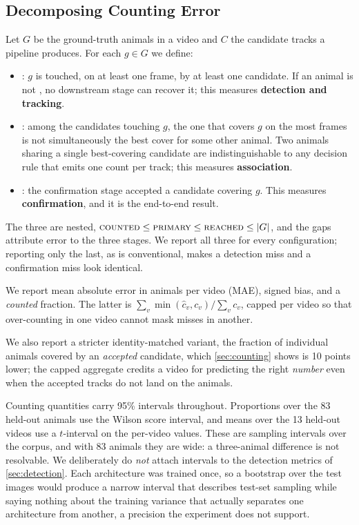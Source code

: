 \subsection{Decomposing Counting Error}
\label{sec:decomposition}

 Let $G$ be the ground-truth animals in a video and $C$
the candidate tracks a pipeline produces. For each $g\in G$ we define:

\begin{itemize}[leftmargin=*,labelsep=4.5mm]
\item \reachedq: $g$ is touched, on at least one frame, by at least one candidate. If
an animal is not \reachedq, no downstream stage can recover it; this measures
\textbf{detection and tracking}.
\item \primaryq: among the candidates touching $g$, the one that covers $g$ on the most
frames is not simultaneously the best cover for some other animal. Two animals sharing a
single best-covering candidate are indistinguishable to any decision rule that emits one
count per track; this measures \textbf{association}.
\item \countedq: the confirmation stage accepted a candidate covering $g$. This measures
\textbf{confirmation}, and it is the end-to-end result.
\end{itemize}

The three are nested, $\textsc{counted} \le \textsc{primary} \le \textsc{reached} \le |G|$, and the gaps
attribute error to the three stages. We report all three for every configuration; reporting
only the last, as is conventional, makes a detection miss and a confirmation miss look identical.

We report mean absolute error in animals per video (MAE), signed bias, and a \emph{counted}
fraction. The latter is $\sum_v \min(\hat{c}_v, c_v) / \sum_v c_v$, capped per video so that
over-counting in one video cannot mask misses in another.

We also report a stricter identity-matched variant, the fraction of individual animals
covered by an \emph{accepted} candidate, which \cref{sec:counting} shows is 10 points
lower; the capped aggregate credits a video for predicting the right \emph{number} even
when the accepted tracks do not land on the animals.

Counting quantities carry 95\% intervals throughout. Proportions over the 83 held-out animals
use the Wilson score interval, and means over the 13 held-out videos use a $t$-interval on the
per-video values. These are sampling intervals over the corpus, and with 83 animals they are
wide: a three-animal difference is not resolvable. We deliberately do \emph{not} attach
intervals to the detection metrics of \cref{sec:detection}. Each architecture was trained
once, so a bootstrap over the test images would produce a narrow interval that describes
test-set sampling while saying nothing about the training variance that actually separates one
architecture from another, a precision the experiment does not support.

